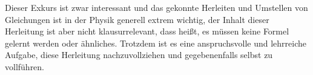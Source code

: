 \begin{Anmerkung}
Dieser Exkurs ist zwar interessant und das gekonnte Herleiten und Umstellen von Gleichungen ist in der Physik generell extrem wichtig, der Inhalt dieser Herleitung ist aber nicht klausurrelevant, dass heißt, es müssen keine Formel gelernt werden oder ähnliches. Trotzdem ist es eine anspruchsvolle und lehrreiche Aufgabe, diese Herleitung nachzuvollziehen und gegebenenfalls selbst zu vollführen.
\end{Anmerkung}




